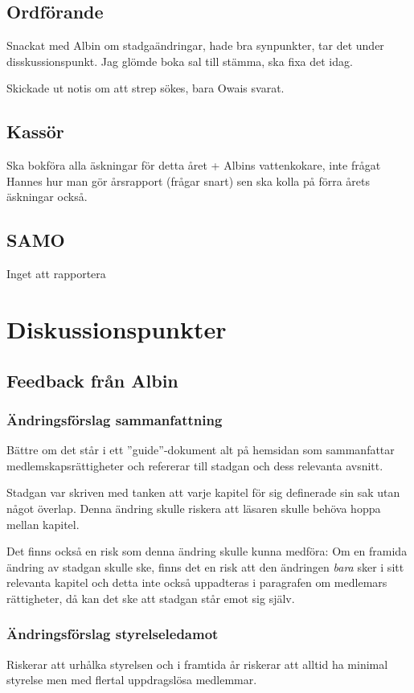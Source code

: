 \documentclass[protokoll]{dvd}
\begin{document}
\subsection{Ordförande}
Snackat med Albin om stadgaändringar, hade bra synpunkter, tar det under disskussionspunkt. 
Jag glömde boka sal till stämma, ska fixa det idag.

Skickade ut notis om att strep sökes, bara Owais svarat.

\subsection{Kassör}
Ska bokföra alla äskningar för detta året + Albins vattenkokare, inte frågat
Hannes hur man gör årsrapport (frågar snart) sen ska kolla på förra årets äskningar också. 

\subsection{SAMO}
Inget att rapportera

\newpage


\section{Diskussionspunkter}
\subsection*{Feedback från Albin}
\subsubsection*{Ändringsförslag sammanfattning}
Bättre om det står i ett ''guide''-dokument alt på hemsidan som sammanfattar medlemskapsrättigheter och refererar till stadgan och dess relevanta avsnitt. 

Stadgan var skriven med tanken att varje kapitel för sig definerade sin sak utan något överlap. Denna ändring skulle riskera att läsaren skulle behöva hoppa mellan kapitel. 

Det finns också en risk som denna ändring skulle kunna medföra: Om en framida ändring av stadgan skulle ske, finns det en risk att den ändringen \textit{bara} sker i sitt relevanta kapitel och detta inte också uppadteras i paragrafen om medlemars rättigheter, då kan det ske att stadgan står emot sig själv. 


\subsubsection*{Ändringsförslag styrelseledamot}
Riskerar att urhålka styrelsen och i framtida år riskerar att alltid ha minimal styrelse men med flertal uppdragslösa medlemmar. 
\end{document}
